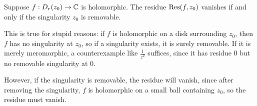 \documentclass{homework}
\begin{document}
                                                                                                                                                                                                        \begin{problem}\label{zero-residue-not-enough}Suppose $f : D_r(z_0) \to \mathbb{C}$ is holomorphic.  The residue
                                                                                                                                                                                                          $\operatorname{Res}(f,z_0)$ vanishes if and only if the singularity $z_0$ is
                                                                                                                                                                                                            removable.
                                                                                                                                                                                                            \end{problem}
                                                                                                                                                                                                            \begin{solution}
                                                                                                                                                                                                            This is true for stupid reasons: if $f$ is holomorphic on a disk surrounding $z_0$, then $f$ has no singularity at $z_0$, so if a singularity exists, it is surely removable. If it is merely meromorphic, a counterexample like $\frac{1}{z^2}$ suffices, since it has residue $0$ but no removable singularity at $0$.

                                                                                                                                                                                                            However, if the singularity is removable, the residue will vanish, since after removing the singularity, $f$ is holomorphic on a small ball containing $z_0$, so the residue must vanish.


                                                                                                                                                                                                            \end{solution}
\end{document}
